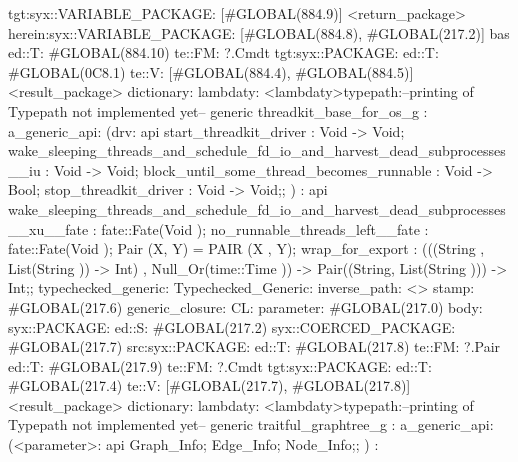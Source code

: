                                                                         tgt:syx::VARIABLE_PACKAGE:
                                                                         [#GLOBAL(884.9)]
                                                         <return_package>
                                            herein:syx::VARIABLE_PACKAGE:
                                             [#GLOBAL(884.8), #GLOBAL(217.2)]
                                     bas
                            ed::T: #GLOBAL(884.10) te::FM: ?.Cmdt
                tgt:syx::PACKAGE:
                 ed::T: #GLOBAL(0C8.1) te::V: [#GLOBAL(884.4), #GLOBAL(884.5)]
         <result_package>
dictionary:
lambdaty:
  <lambdaty>typepath:--printing of Typepath not implemented yet--
generic threadkit_base_for_os_g
:
a_generic_api:
(drv:
api {
    start_threadkit_driver : Void -> Void;
    wake_sleeping_threads_and_schedule_fd_io_and_harvest_dead_subprocesses__iu : Void -> Void;
    block_until_some_thread_becomes_runnable : Void -> Bool;
    stop_threadkit_driver : Void -> Void;};
)
:
api {   wake_sleeping_threads_and_schedule_fd_io_and_harvest_dead_subprocesses__xu__fate :
        fate::Fate(Void );
    no_runnable_threads_left__fate : fate::Fate(Void );
    Pair (X, Y) = PAIR (X , Y);
        wrap_for_export :
        (((String , List(String )) -> Int) , Null_Or(time::Time )) -> Pair((String, List(String ))) -> Int;};
typechecked_generic:
Typechecked_Generic:
inverse_path: <>
stamp: #GLOBAL(217.6)
generic_closure:
CL:
parameter: #GLOBAL(217.0)
body: syx::PACKAGE:
        ed::S: #GLOBAL(217.2)
            syx::COERCED_PACKAGE:
                #GLOBAL(217.7)
                 src:syx::PACKAGE:
                        ed::T: #GLOBAL(217.8) te::FM: ?.Pair
                        ed::T: #GLOBAL(217.9) te::FM: ?.Cmdt
                tgt:syx::PACKAGE:
                 ed::T: #GLOBAL(217.4) te::V: [#GLOBAL(217.7), #GLOBAL(217.8)]
         <result_package>
dictionary:
lambdaty:
  <lambdaty>typepath:--printing of Typepath not implemented yet--
generic traitful_graphtree_g
:
a_generic_api:
(<parameter>:
api {
    Graph_Info;
    Edge_Info;
    Node_Info;};
)
:
